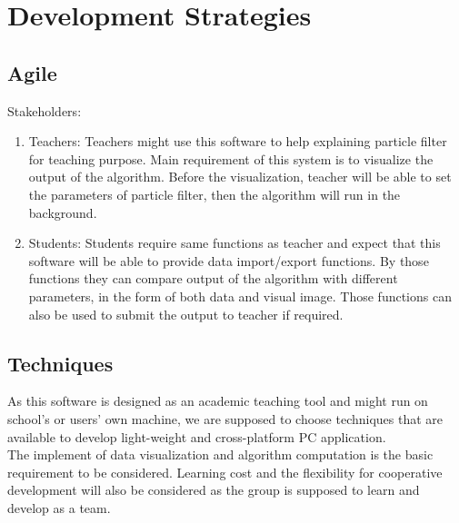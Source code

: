 
\section{Development Strategies}
\subsection{Agile}
Stakeholders:
\begin{enumerate}
  \item Teachers: Teachers might use this software to help explaining particle filter for teaching purpose. Main requirement of this system is to visualize the output of the algorithm. Before the visualization, teacher will be able to set the parameters of particle filter, then the algorithm will run in the background.
  \item Students: Students require same functions as teacher and expect that this software will be able to provide data import/export functions. By those functions they can compare output of the algorithm with different parameters, in the form of both data and visual image. Those functions can also be used to submit the output to teacher if required.

\end{enumerate}
\subsection{Techniques}
As this software is designed as an academic teaching tool and might run on school’s or users’ own machine, we are supposed to choose techniques that are available to develop light-weight and cross-platform PC application.\\
The implement of data visualization and algorithm computation is the basic requirement to be considered.
Learning cost and the flexibility for cooperative development will also be considered as the group is supposed to learn and develop as a team. 

